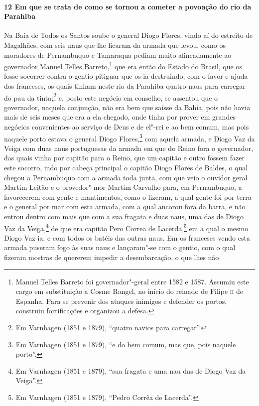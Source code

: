 \begin{linenumbers}
\paragraph{12 Em que se trata de como se tornou a cometer a povoação do rio da Parahiba} \quad
Na Baía de Todos os Santos soube o general Diogo Flores, vindo aí do estreito de
Magalhães, com seis naus que lhe ficaram da armada que levou, como os moradores de
Pernambuquo e Tamaraqua pediam muito afincadamente ao governador Manuel Telles
Barreto,\footnote{ Manuel Telles Barreto foi governador"-geral entre 1582 e 1587. Assumiu
este cargo em substituição a Cosme Rangel, no início do reinado de Filipe \textsc{ii} de
Espanha. Para se prevenir dos ataques inimigos e defender os portos, construiu
fortificações e organizou a defesa.} que era então do Estado do Brasil, que os fosse
socorrer contra o gentio pitiguar que os ia destruindo, com o favor e ajuda dos franceses,
os quais tinham neste rio da Parahiba quatro naus para carregar do pau da tinta;\footnote{
Em Varnhagen (1851 e 1879), ``quatro navios para carregar''.} e, posto este negócio em
conselho, se assentou que o governador, naquela conjunção, não era bem que saísse da
Bahia, pois não havia mais de seis meses que era a ela chegado, onde tinha por prover em
grandes negócios convenientes ao serviço de Deus e de el"-rei e ao bem comum, mas pois
naquele porto estava o general Diogo Flores,\footnote{ Em Varnhagen (1851 e 1879), ``e do
bem comum, mas que, pois naquele porto''.} com aquela armada, e Diogo Vaz da Veiga com
duas naus portuguesas da armada em que do Reino fora o governador, das quais vinha por
capitão para o Reino, que um capitão e outro fossem fazer este socorro, indo por cabeça
principal o capitão Diogo Flores de Baldes, o qual chegou a Pernambuquo com a armada toda
junta, com que veio o ouvidor geral Martim Leitão e o provedor"-mor Martim Carvalho para,
em Pernambuquo, a favorecerem com gente e mantimentos, como o fizeram, a qual gente foi
por terra e o general por mar com esta armada, com a qual ancorou fora da barra, e não
entrou dentro com mais que com a sua fragata e duas naus, uma das de Diogo Vaz da
Veiga,\footnote{ Em Varnhagen (1851 e 1879), ``sua fragata e uma nau das de Diogo Vaz da
Veiga''.} de que era capitão Pero Correa de Lacerda,\footnote{ Em Varnhagen (1851 e 1879),
``Pedro Corrêa de Lacerda''.} em a qual o mesmo Diogo Vaz ia, e com todos os batéis das
outras naus. Em os franceses vendo esta armada puseram fogo às suas naus e lançaram"-se com
o gentio, com o qual fizeram mostras de quererem impedir a desembarcação, o que lhes não

\end{linenumbers}
